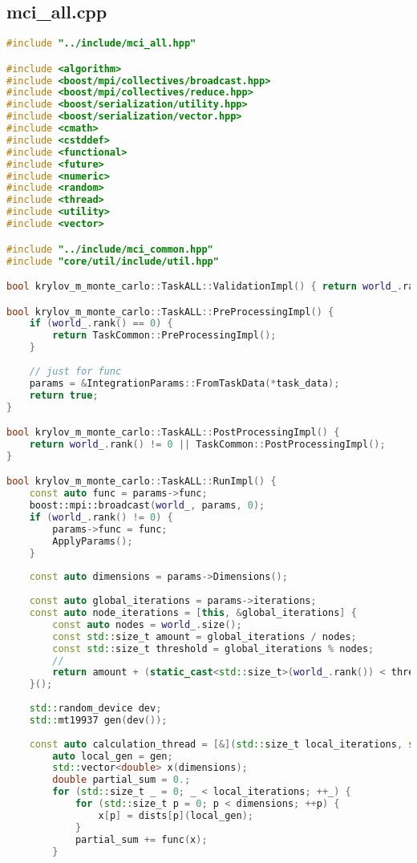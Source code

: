 \documentclass[a4paper,12pt]{article}
\begin{document}
\subsection{mci\_all.cpp}
\begin{lstlisting}[language=C++]
#include "../include/mci_all.hpp"

#include <algorithm>
#include <boost/mpi/collectives/broadcast.hpp>
#include <boost/mpi/collectives/reduce.hpp>
#include <boost/serialization/utility.hpp>
#include <boost/serialization/vector.hpp>
#include <cmath>
#include <cstddef>
#include <functional>
#include <future>
#include <numeric>
#include <random>
#include <thread>
#include <utility>
#include <vector>

#include "../include/mci_common.hpp"
#include "core/util/include/util.hpp"

bool krylov_m_monte_carlo::TaskALL::ValidationImpl() { return world_.rank() != 0 || TaskCommon::ValidationImpl(); }

bool krylov_m_monte_carlo::TaskALL::PreProcessingImpl() {
	if (world_.rank() == 0) {
		return TaskCommon::PreProcessingImpl();
	}
	
	// just for func
	params = &IntegrationParams::FromTaskData(*task_data);
	return true;
}

bool krylov_m_monte_carlo::TaskALL::PostProcessingImpl() {
	return world_.rank() != 0 || TaskCommon::PostProcessingImpl();
}

bool krylov_m_monte_carlo::TaskALL::RunImpl() {
	const auto func = params->func;
	boost::mpi::broadcast(world_, params, 0);
	if (world_.rank() != 0) {
		params->func = func;
		ApplyParams();
	}
	
	const auto dimensions = params->Dimensions();
	
	const auto global_iterations = params->iterations;
	const auto node_iterations = [this, &global_iterations] {
		const auto nodes = world_.size();
		const std::size_t amount = global_iterations / nodes;
		const std::size_t threshold = global_iterations % nodes;
		//
		return amount + (static_cast<std::size_t>(world_.rank()) < threshold ? 1 : 0);
	}();
	
	std::random_device dev;
	std::mt19937 gen(dev());
	
	const auto calculation_thread = [&](std::size_t local_iterations, std::promise<double>&& promise) {
		auto local_gen = gen;
		std::vector<double> x(dimensions);
		double partial_sum = 0.;
		for (std::size_t _ = 0; _ < local_iterations; ++_) {
			for (std::size_t p = 0; p < dimensions; ++p) {
				x[p] = dists[p](local_gen);
			}
			partial_sum += func(x);
		}
		

\end{lstlisting}
\end{document}
